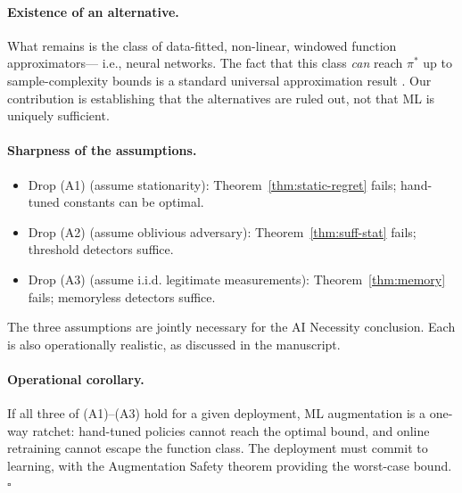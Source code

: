 \paragraph{Existence of an alternative.} What remains is the class of
data-fitted, non-linear, windowed function approximators---
i.e., neural networks. The fact that this class \emph{can} reach
$\pi^*$ up to sample-complexity bounds is a standard universal
approximation result \cite{vaswani2017attention,lim2021temporal}. Our
contribution is establishing that the alternatives are ruled out, not
that ML is uniquely sufficient.

\paragraph{Sharpness of the assumptions.}
\begin{itemize}\setlength\itemsep{1pt}
\item Drop (A1) (assume stationarity): Theorem~\ref{thm:static-regret}
fails; hand-tuned constants can be optimal.
\item Drop (A2) (assume oblivious adversary):
Theorem~\ref{thm:suff-stat} fails; threshold detectors suffice.
\item Drop (A3) (assume i.i.d. legitimate measurements):
Theorem~\ref{thm:memory} fails; memoryless detectors suffice.
\end{itemize}
The three assumptions are jointly necessary for the AI Necessity
conclusion. Each is also operationally realistic, as discussed in
the manuscript.

\paragraph{Operational corollary.} If all three of (A1)--(A3) hold for
a given deployment, ML augmentation is a one-way ratchet: hand-tuned
policies cannot reach the optimal bound, and online retraining cannot
escape the function class. The deployment must commit to learning,
with the Augmentation Safety theorem providing the worst-case bound.
$\square$
